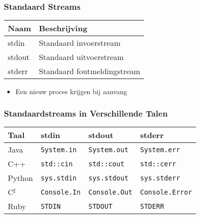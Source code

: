 \begin{frame}
  \frametitle{Standaard Streams}
  \begin{center}
    \begin{tabular}{ll}
      \bfseries Naam & \bfseries Beschrijving \\
      \toprule
      \ttfamily stdin  & Standaard invoerstream \\
      \ttfamily stdout & Standaard uitvoerstream \\
      \ttfamily stderr & Standaard foutmeldingstream \\
      \bottomrule
    \end{tabular}
  \end{center}
  \vskip4mm
  \begin{itemize}
    \item Een nieuw proces krijgen bij aanvang 
  \end{itemize}
  \begin{center}
  \end{center}
\end{frame}

\begin{frame}
  \frametitle{Standaardstreams in Verschillende Talen}
  \begin{center}
    \begin{tabular}{llll}
      \bfseries Taal & \bfseries stdin & \bfseries stdout & \bfseries stderr \\
      \toprule
      Java & \texttt{System.in} & \texttt{System.out} & \texttt{System.err} \\
      C++ & \texttt{std::cin} & \texttt{std::cout} & \texttt{std::cerr} \\
      Python & \texttt{sys.stdin} & \texttt{sys.stdout} & \texttt{sys.stderr} \\
      C$^\sharp$ & \texttt{Console.In} & \texttt{Console.Out} & \texttt{Console.Error} \\
      Ruby & \texttt{STDIN} & \texttt{STDOUT} & \texttt{STDERR} \\
      \bottomrule
    \end{tabular}
  \end{center}
\end{frame}


